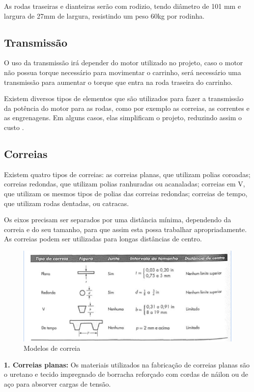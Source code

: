 \par As rodas traseiras e dianteiras serão com rodizio, tendo diâmetro de 101 mm e largura de 27mm de largura, resistindo um peso 60kg por rodinha.

\subsection{Transmissão}

O uso da transmissão irá depender do motor utilizado no projeto, caso o motor não possua torque necessário para movimentar o carrinho, será necessário uma transmissão para aumentar o torque que entra na roda traseira do carrinho.
	
\par Existem diversos tipos de elementos que são utilizados para fazer a transmissão da potência do motor para as rodas, como por exemplo as correias, as correntes e as engrenagens. Em alguns casos, elas simplificam o projeto, reduzindo assim o custo \cite{Projmec}.

\subsection{Correias}
Existem quatro tipos de correias: as correias planas, que utilizam polias coroadas; correias redondas, que utilizam polias ranhuradas ou acanaladas; correias em V, que utilizam os mesmos tipos de polias das correias redondas; correias de tempo, que utilizam rodas dentadas, ou catracas.
	
\par Os eixos precisam ser separados por uma distância mínima, dependendo da correia e do seu tamanho, para que assim esta possa trabalhar apropriadamente. As correias podem ser utilizadas para longas distâncias de centro.

 \begin{figure}[ht]
		\centering
		\includegraphics[width=.6\textwidth]{figuras/correia.png}
		\caption{Modelos de correia}
		\label{fig:correia}
	\end{figure} 

\textbf{1. Correias planas:}
Os materiais utilizados na fabricação de correias planas são o uretano e tecido impregnado de borracha reforçado com cordas de náilon ou de aço para absorver cargas de tensão.	

